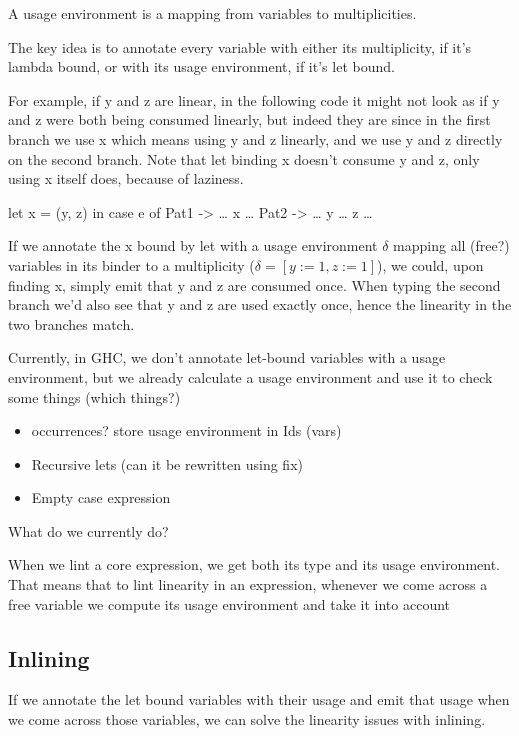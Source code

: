 \documentclass[a4paper, draft]{article}
\begin{document}
A usage environment is a mapping from variables to multiplicities.

The key idea is to annotate every variable with either its multiplicity, if it's
lambda bound, or with its usage environment, if it's let bound.

For example, if y and z are linear, in the following code it might not look as
if y and z were both being consumed linearly, but indeed they are since in the
first branch we use x which means using y and z linearly, and we use y and z
directly on the second branch. Note that let binding x doesn't consume y and z,
only using x itself does, because of laziness.
\begin{code}
let x = (y, z) in
case e of
  Pat1 -> … x …
  Pat2 -> … y … z …
\end{code}

If we annotate the x bound by let with a usage environment $\delta$ mapping all (free?)
variables in its binder to a multiplicity ($\delta = [y := 1, z := 1]$), we
could, upon finding x, simply emit that y and z are consumed once. When typing
the second branch we'd also see that y and z are used exactly once, hence the
linearity in the two branches match.

Currently, in GHC, we don't annotate let-bound variables with a usage
environment, but we already calculate a usage environment and use it to check
some things (which things?)

\begin{itemize}
    \item occurrences? store usage environment in Ids (vars)
    \item Recursive lets (can it be rewritten using fix)
    \item Empty case expression
\end{itemize}

What do we currently do?

When we lint a core expression, we get both its type and its usage environment.
That means that to lint linearity in an expression, whenever we come across a
free variable we compute its usage environment and take it into account

\subsection{Inlining}

If we annotate the let bound variables with their usage and emit that usage when
we come across those variables, we can solve the linearity issues with inlining.
\end{document}
